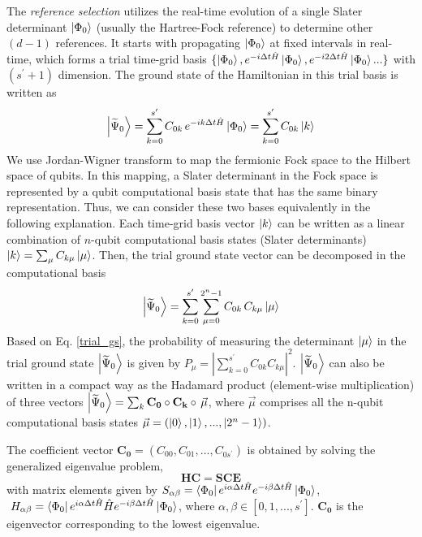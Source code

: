 \documentclass[journal=jctcce,manuscript=article]{achemso}
\begin{document}
The \textit{reference selection} utilizes the real-time evolution of a single Slater determinant $\left\vert{\Phi_0}\right\rangle$ (usually the Hartree-Fock reference) to determine other $(d-1)$ references.
It starts with propagating $\left\vert{\Phi_0}\right\rangle$ at fixed intervals in real-time, which forms a trial time-grid basis $\{\left\vert{\Phi_0}\right\rangle, e^{-i\Delta t \hat{H}} \left\vert{\Phi_0}\right\rangle, e^{-i2\Delta t \hat{H}} \left\vert{\Phi_0}\right\rangle...\}$ with $(s^{\prime}+1)$ dimension.
The ground state of the Hamiltonian in this trial basis is written as
\begin{equation}
\left\vert{\widetilde{\Psi}_{0}}\right\rangle = \sum_{k=0}^{s^{\prime}} C_{0 k} \, e^{-i k \Delta t \hat{H}} \left\vert{\Phi_{0}}\right\rangle
= \sum_{k=0}^{s^{\prime}} C_{0 k}  \left\vert{k}\right\rangle
\end{equation}
We use Jordan-Wigner transform\cite{jordan1993paulische} to map the fermionic Fock space to the Hilbert space of qubits.\cite{whitfield2011simulation} In this mapping, a Slater determinant in the Fock space is represented by a qubit computational basis state that has the same binary representation. Thus, we can consider these two bases equivalently in the following explanation. 
Each time-grid basis vector $\left\vert{k}\right\rangle$ can be written as a linear combination of $n$-qubit computational basis states (Slater determinants) $\left\vert{k}\right\rangle = \sum_{\mu} C_{k \mu} \left\vert{\mu}\right\rangle$. Then, the trial ground state vector can be decomposed in the computational basis
\begin{equation}
\label{trial_gs}
\left\vert{\widetilde{\Psi}_{0}}\right\rangle = \sum_{k=0}^{s^{\prime}} \sum_{\mu=0}^{2^{n}-1}  C_{0 k} \, C_{k \mu} \left\vert{\mu}\right\rangle 
\end{equation}
Based on Eq. \ref{trial_gs}, the probability of measuring the determinant $\left\vert{\mu}\right\rangle$ in the trial ground state $\left\vert{\widetilde{\Psi}_{0}}\right\rangle$ is given by $P_{\mu}=|\sum_{k=0}^{s^{\prime}} C_{0 k} C_{k \mu}|^{2}$.
$\left\vert{\widetilde{\Psi}_{0}}\right\rangle$ can also be written in a compact way as the Hadamard product\cite{horn2012matrix} (element-wise multiplication) of three vectors $\left\vert{\widetilde{\Psi}_{0}}\right\rangle = \sum_{k} \mathbf{C_{0}}  \circ  \mathbf{C_{k }}   \circ \,  \vec{\mu}$,
where $\vec{\mu}$ comprises all the n-qubit computational basis states $\vec{\mu} = (\left\vert{0}\right\rangle, \left\vert{1}\right\rangle, ... ,\left\vert{2^{n}-1}\right\rangle)$.

The coefficient vector $\mathbf{C_{0}} = (C_{00}, C_{01}, ... , C_{0s^{\prime}} )$ is obtained by solving the generalized eigenvalue problem,
\begin{equation}
\label{ge}
\mathbf{HC} = \mathbf{SCE}
\end{equation}
with matrix elements given by 
$S_{\alpha \beta} = \left\langle{\Phi_0}\right\vert e^{i \alpha \Delta t \hat{H}} e^{-i \beta \Delta t \hat{H}} \left\vert{\Phi_0}\right\rangle $,
$\ H_{\alpha \beta} = \left\langle{\Phi_0}\right\vert e^{i \alpha \Delta t \hat{H}}  \hat{H}   e^{-i \beta \Delta t \hat{H}}  \left\vert{\Phi_0}\right\rangle$,
where $\alpha, \beta \in [0,1,...,s^{\prime}]$. $\mathbf{C_{0}}$ is the eigenvector corresponding to the lowest eigenvalue.
\end{document}
